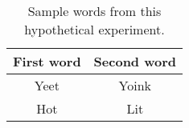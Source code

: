 \documentclass[doc,12pt,floatsintext]{apa7}
\begin{document}
\begin{table}
    \caption{Sample words from this hypothetical experiment.}
    \centering
    \begin{tabular}{cc} %
        \hline
         First word & Second word \\
         \hline
         Yeet & Yoink \\
         Hot & Lit \\
         \hline
    \end{tabular}
    \label{tab:table_words}
\end{table}
\end{document}

